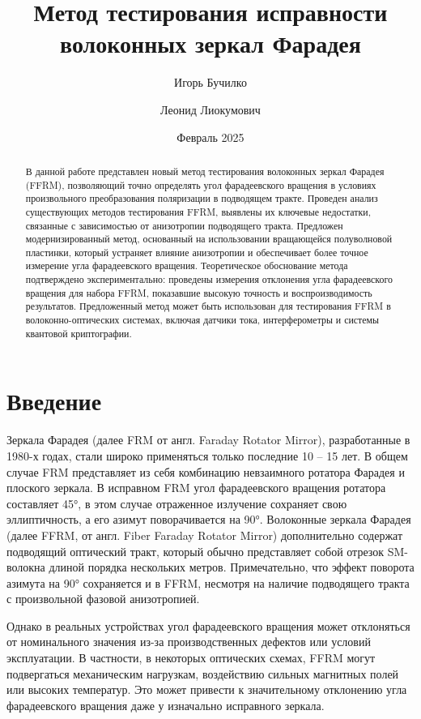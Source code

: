 \documentclass{article}
\title{Метод тестирования исправности волоконных зеркал Фарадея}
\author[1]{Игорь Бучилко}
\author[1]{Леонид Лиокумович}
\affil[1]{Санкт-Петербургский политехнический Университет Петра Великого}
\date{Февраль 2025}
\begin{document}
	
\maketitle
\begin{abstract}
В данной работе представлен новый метод тестирования волоконных зеркал Фарадея (FFRM), позволяющий точно определять угол фарадеевского вращения в условиях произвольного преобразования поляризации в подводящем тракте. Проведен анализ существующих методов тестирования FFRM, выявлены их ключевые недостатки, связанные с зависимостью от анизотропии подводящего тракта. Предложен модернизированный метод, основанный на использовании вращающейся полуволновой пластинки, который устраняет влияние анизотропии и обеспечивает более точное измерение угла фарадеевского вращения. Теоретическое обоснование метода подтверждено экспериментально: проведены измерения отклонения угла фарадеевского вращения для набора FFRM, показавшие высокую точность и воспроизводимость результатов. Предложенный метод может быть использован для тестирования FFRM в волоконно-оптических системах, включая датчики тока, интерферометры и системы квантовой криптографии. 
\end{abstract}

\section{Введение}
Зеркала Фарадея (далее FRM от англ. Faraday Rotator Mirror), разработанные в 1980-х годах,  стали широко применяться только последние 10 – 15 лет.  В общем случае FRM представляет из себя комбинацию невзаимного ротатора Фарадея и плоского зеркала\autocite{paschottaFaradayMirrors2022}. В исправном FRM угол фарадеевского вращения ротатора составляет 45°, в этом случае отраженное излучение сохраняет свою эллиптичность, а его азимут поворачивается на 90°. Волоконные зеркала Фарадея (далее FFRM, от англ. Fiber Faraday Rotator Mirror) дополнительно содержат подводящий оптический тракт, который обычно представляет собой отрезок SM-волокна длиной порядка нескольких метров. Примечательно, что эффект поворота азимута на 90° сохраняется и в FFRM, несмотря на наличие подводящего тракта с произвольной фазовой анизотропией.

Однако в реальных устройствах угол фарадеевского вращения может отклоняться от номинального значения из-за производственных дефектов или условий эксплуатации. В частности, в некоторых оптических схемах, FFRM могут подвергаться механическим нагрузкам, воздействию сильных магнитных полей или высоких температур. Это может привести к значительному отклонению угла фарадеевского вращения даже у изначально исправного зеркала.
\end{document}
